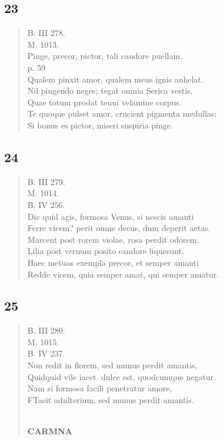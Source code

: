 \documentclass[11pt, a4paper]{report}
\begin{document}
            \subsection*{23}
      \begin{verse}
      B. III 278. \\ M. 1013. \\ Pinge, precor, pictor, tali caudore puellam, \\ p. 59 \\ Qualem pinxit amor, qualem meus ignis anhelat. \\ Nil pingendo neges; tegat omnia Serica vestis, \\ Quae totum prodat teuui velamine corpus. \\ Te quoque pulset amor, crucient pigmenta medullas; \\ Si bonus es pictor, miseri suspiria pinge. \\ 
      \end{verse}
  
            \subsection*{24}
      \begin{verse}
      B. III 279. \\ M. 1014. \\ B. IV 256. \\ Dic quid agis, formosa Venus, si nescis amanti \\ Ferre vicem? perit omne decus, dum deperit aetas. \\ Marcent post rorem violae, rosa perdit odorem, \\ Lilia post vernum posito candore liquesunt. \\ Haec metuas exempla precor, et semper amanti \\ Redde vicem, quia semper amat, qui semper amatur. \\ 
      \end{verse}
  
            \subsection*{25}
      \begin{verse}
      B. III 280. \\ M. 1015. \\ B. IV 237. \\ Non redit in florem, sed munus perdit amantis, \\ Quidquid vile iacet. dulce est, quodcumque negatur. \\ Nam si formosa facili penetratur amore, \\ FTacit adulterium, sed munus perdit amantis. \\ 
        ﻿\pagebreak 
     \marginpar{[98]} \begin{center} \textbf{CARMNA} \end{center}
      \end{verse}
  
\end{document}

